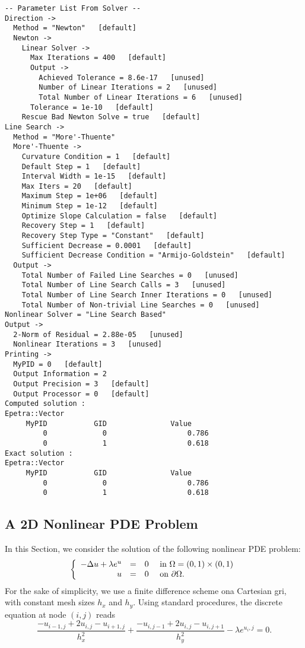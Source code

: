 \begin{verbatim}
-- Parameter List From Solver --
Direction ->
  Method = "Newton"   [default]
  Newton ->
    Linear Solver ->
      Max Iterations = 400   [default]
      Output ->
        Achieved Tolerance = 8.6e-17   [unused]
        Number of Linear Iterations = 2   [unused]
        Total Number of Linear Iterations = 6   [unused]
      Tolerance = 1e-10   [default]
    Rescue Bad Newton Solve = true   [default]
Line Search ->
  Method = "More'-Thuente"
  More'-Thuente ->
    Curvature Condition = 1   [default]
    Default Step = 1   [default]
    Interval Width = 1e-15   [default]
    Max Iters = 20   [default]
    Maximum Step = 1e+06   [default]
    Minimum Step = 1e-12   [default]
    Optimize Slope Calculation = false   [default]
    Recovery Step = 1   [default]
    Recovery Step Type = "Constant"   [default]
    Sufficient Decrease = 0.0001   [default]
    Sufficient Decrease Condition = "Armijo-Goldstein"   [default]
  Output ->
    Total Number of Failed Line Searches = 0   [unused]
    Total Number of Line Search Calls = 3   [unused]
    Total Number of Line Search Inner Iterations = 0   [unused]
    Total Number of Non-trivial Line Searches = 0   [unused]
Nonlinear Solver = "Line Search Based"
Output ->
  2-Norm of Residual = 2.88e-05   [unused]
  Nonlinear Iterations = 3   [unused]
Printing ->
  MyPID = 0   [default]
  Output Information = 2
  Output Precision = 3   [default]
  Output Processor = 0   [default]
Computed solution :
Epetra::Vector
     MyPID           GID               Value
         0             0                   0.786
         0             1                   0.618
Exact solution :
Epetra::Vector
     MyPID           GID               Value
         0             0                   0.786
         0             1                   0.618
\end{verbatim}


\subsection{A 2D Nonlinear PDE Problem}
\label{sec:nox_2d}

In this Section, we consider the solution of the following nonlinear PDE
problem:
\begin{equation}
  \label{eq:nox_nonlinear_2d}
  \left\{
    \begin{array}{r c l l }
      - \Delta u + \lambda e^u & = & 0 & \mbox{ in } \Omega = (0,1)
      \times (0,1) \\
      u & = & 0 & \mbox{ on } \partial \Omega .
    \end{array}
  \right.   
\end{equation}
For the sake of simplicity, we use a finite difference scheme ona
Cartesian gri, with constant mesh sizes $h_x$ and $h_y$. Using standard
procedures, the discrete equation at node $(i,j)$ reads
\[
\frac{ - u_{i-1,j} + 2 u_{i,j} - u_{i+1,j} }{ h_x^2} +
\frac{ - u_{i,j-1} + 2 u_{i,j} - u_{i,j+1} }{ h_y^2}  -
\lambda e^{u{_i,j}} = 0 .
\]

